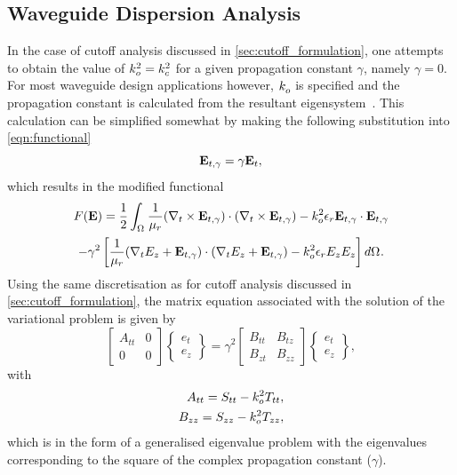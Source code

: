 \subsection{Waveguide Dispersion Analysis}
\label{sec:propagation_curves}
In the case of cutoff analysis discussed in
\ref{sec:cutoff_formulation}, one attempts to obtain the value of
$k_{o}^{2} = k_{c}^{2}$ for a given propagation constant $\gamma$,
namely $\gamma = 0$.  For most waveguide design applications however,
$k_{o}^{}$ is specified and the propagation constant is calculated
from the resultant eigensystem~\cite{Jin2002, PelCoc1998}.  This
calculation can be simplified somewhat by making the following
substitution into \eqref{eqn:functional}
\begin{equation}
    \mathbf{E}_{t,\gamma} = \gamma\mathbf{E}_t,
\end{equation}
which results in the modified functional
\begin{multline}
    \label{eqn:functional_scaled}
    F(\field{E}) =
    \inv{2}\int_{\Domain{}}\inv{\ur}(\curl{\Ef_{t,\gamma}}{t})\cdot(\curl{\Ef_{t,\gamma}}{t}) -\ko{o}{2}\er\Ef_{t,\gamma}\cdot{\Ef_{t,\gamma}}\\
    -\gamma^2\left[\inv{\ur}(\del{E_z}{t} +
    \Ef_{t,\gamma})\cdot(\del{E_z}{t} + \Ef_{t,\gamma})-\ko{o}{2}\er
    E_z{E_z}\right] d\Domain{}.
\end{multline}
Using the same discretisation as for cutoff analysis discussed in \ref{sec:cutoff_formulation}, the matrix equation associated with the solution of the variational problem is given by
\begin{equation}
    \label{eqn:matrix_equation_dispersion}
    \begin{bmatrix} A_{tt} & 0\\0 & 0\end{bmatrix}\begin{Bmatrix}e_t\\e_z\end{Bmatrix} = 
    \gamma^2\begin{bmatrix} B_{tt} & B_{tz}\\B_{zt} &
    B_{zz}\end{bmatrix}\begin{Bmatrix}e_t\\e_z\end{Bmatrix},
\end{equation}
with
\begin{align}
    A_{tt} = S_{tt} - k_{o}^{2}T_{tt},\\
    B_{zz} = S_{zz} - k_{o}^{2}T_{zz},
\end{align}
which is in the form of a generalised eigenvalue
problem with the eigenvalues corresponding
to the square of the complex propagation constant ($\gamma$).

